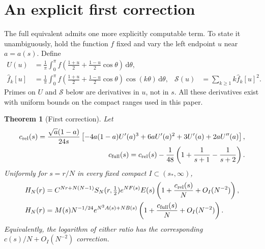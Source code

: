 \documentclass[11pt,a4paper]{article}
\numberwithin{equation}{section}
\newtheorem{theorem}{Theorem}[section]
\theoremstyle{remark}\newtheorem{remark}[theorem]{Remark}
\newcommand{\dd}{\,\mathrm d}
\newcommand{\fh}{\widehat f}
\begin{document}
\section{An explicit first correction}\label{psh:sec:correction}
The full equivalent admits one more explicitly computable term. To state
it unambiguously, hold the function $f$ fixed and vary the left endpoint
$u$ near $a=a(s)$. Define
\begin{align}
 U(u)&=\frac1\pi\int_0^\pi
 f\left(\frac{1+u}{2}+\frac{1-u}{2}\cos\theta\right)\dd\theta,
 \label{psh:eq:U}\\
 \fh_k[u]&=\frac1\pi\int_0^\pi
 f\left(\frac{1+u}{2}+\frac{1-u}{2}\cos\theta\right)
 \cos(k\theta)\dd\theta,
 &\mathcal S(u)&=\sum_{k\geq1}k\fh_k[u]^2.\label{psh:eq:energyu}
\end{align}
Primes on $U$ and $\mathcal S$ below are derivatives in $u$, not in $s$.
All these derivatives exist with uniform bounds on the compact ranges
used in this paper.

\begin{theorem}[First correction]\label{psh:thm:correction}
Let
\begin{align}
 c_{\rm rel}(s)=\frac{\sqrt a(1-a)}{24s}
 \left[-4a(1-a)U'(a)^3+6aU'(a)^2+3U'(a)+2aU''(a)\right],
 \label{psh:eq:crel}\\
 c_{\rm full}(s)=c_{\rm rel}(s)-\frac1{48}
                     \left(1+\frac1{s+1}-\frac1{s+2}\right).
 \label{psh:eq:cfull}
\end{align}
Uniformly for $s=r/N$ in every fixed compact $I\subset(s_*,\infty)$,
\begin{align}
 H_N(r)={}&C^{Nr+N(N-1)}S_N(r,\tfrac12)e^{NF(s)}E(s)
       \left(1+\frac{c_{\rm rel}(s)}N+O_I(N^{-2})\right),\label{psh:eq:correctedS}\\
 H_N(r)={}&M(s)N^{-1/24}e^{N^2A(s)+NB(s)}
       \left(1+\frac{c_{\rm full}(s)}N+O_I(N^{-2})\right).
       \label{psh:eq:correctedfull}
\end{align}
Equivalently, the logarithm of either ratio has the corresponding
$c(s)/N+O_I(N^{-2})$ correction.
\end{theorem}
\end{document}
